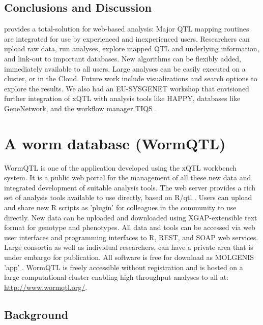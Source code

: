\subsection{Conclusions and Discussion}
\xqtlwb provides a total-solution for web-based analysis: Major QTL mapping routines are integrated 
for use by experienced and inexperienced users. Researchers can upload raw data, run analyses, explore 
mapped QTL and underlying information, and link-out to important databases. New algorithms can be 
flexibly added, immediately available to all users. Large analyses can be easily executed on a cluster, 
or in the Cloud. Future work include visualizations and search options to explore the results. We also 
had an EU-SYSGENET workshop that envisioned further integration of xQTL with analysis tools like HAPPY, 
databases like GeneNetwork, and the workflow manager TIQS \cite{Durrant:2012}.

\section{A worm database (WormQTL)}
WormQTL is one of the application developed using the xQTL workbench system. It is a public web portal 
for the management of all these new data and integrated development of suitable analysis tools. The 
web server provides a rich set of analysis tools available to use directly, based on R/qtl 
\cite{Broman:2003, Arends:2010}. Users can upload and share new R scripts as 'plugin' for colleagues 
in the community to use directly. New data can be uploaded and downloaded using XGAP-extensible 
text format for genotype and phenotypes\cite{Swertz:2010a}. All data and tools can be accessed 
via web user interfaces and programming interfaces to R, REST, and SOAP web services. Large 
consortia as well as individual researchers, can have a private area that is under embargo for 
publication. All software is free for download as MOLGENIS 'app' \cite{Swertz:2010b}. WormQTL is 
freely accessible without registration and is hosted on a large computational cluster enabling 
high throughput analyses to all at:\\
\url{http://www.wormqtl.org/}.

\subsection{Background}

